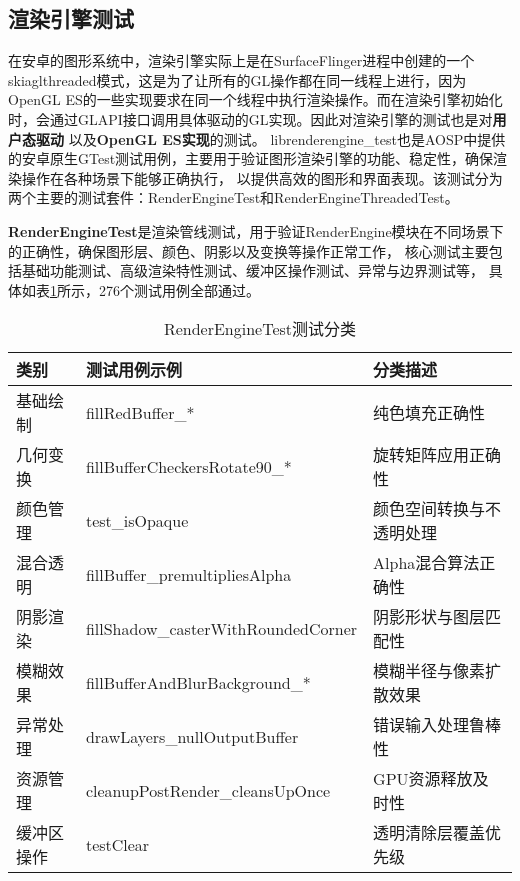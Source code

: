 
\subsection{渲染引擎测试}
\label{sec:渲染引擎正确性测试}

在安卓的图形系统中，渲染引擎实际上是在SurfaceFlinger进程中创建的一个skiaglthreaded模式，这是为了让所有的GL操作都在同一线程上进行，因为
OpenGL ES的一些实现要求在同一个线程中执行渲染操作。而在渲染引擎初始化时，会通过GLAPI接口调用具体驱动的GL实现。因此对渲染引擎的测试也是对\textbf{用户态驱动}
以及\textbf{OpenGL ES实现}的测试。
librenderengine\_test也是AOSP中提供的安卓原生GTest测试用例，主要用于验证图形渲染引擎的功能、稳定性，确保渲染操作在各种场景下能够正确执行，
以提供高效的图形和界面表现。该测试分为两个主要的测试套件：RenderEngineTest和RenderEngineThreadedTest。

\textbf{RenderEngineTest}是渲染管线测试，用于验证RenderEngine模块在不同场景下的正确性，确保图形层、颜色、阴影以及变换等操作正常工作，
核心测试主要包括基础功能测试、高级渲染特性测试、缓冲区操作测试、异常与边界测试等，
具体如表\ref{tab:RenderEngineTest测试分类}所示，276个测试用例全部通过。
    \begin{table}[H]
        \centering
        \caption{RenderEngineTest测试分类}
        \label{tab:RenderEngineTest测试分类}
        \begin{tabular}{lll}
          \toprule
          类别 & 测试用例示例 & 分类描述 \\
          \midrule
            基础绘制 & fillRedBuffer\_* & 纯色填充正确性 \\
            几何变换 & fillBufferCheckersRotate90\_* & 旋转矩阵应用正确性 \\
            颜色管理 & test\_isOpaque & 颜色空间转换与不透明处理 \\
            混合透明 & fillBuffer\_premultipliesAlpha & Alpha混合算法正确性 \\
            阴影渲染 & fillShadow\_casterWithRoundedCorner & 阴影形状与图层匹配性 \\
            模糊效果 & fillBufferAndBlurBackground\_* & 模糊半径与像素扩散效果 \\
            异常处理 & drawLayers\_nullOutputBuffer & 错误输入处理鲁棒性 \\
            资源管理 & cleanupPostRender\_cleansUpOnce & GPU资源释放及时性 \\
            缓冲区操作 & testClear & 透明清除层覆盖优先级 \\
          \bottomrule
        \end{tabular}
        \note{}
    \end{table}


